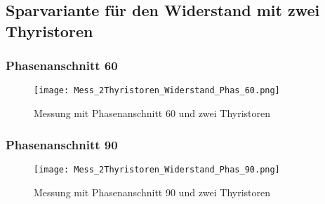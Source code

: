 \begin{appendix}

\newpage
\subsection{Sparvariante für den Widerstand mit zwei Thyristoren} \label{sec:Sparvariante_2Thyristoren}
\subsubsection*{Phasenanschnitt 60\textdegree}

\begin{figure}[ht!]
	\centering
	\texttt{[image: Mess\_2Thyristoren\_Widerstand\_Phas\_60.png]}	
	\caption{Messung mit Phasenanschnitt 60\textdegree \hspace{0.02cm} und zwei Thyristoren}\label{fig:Mess_2Thyristoren_Phas_60grad}
\end{figure}

\newpage
\subsubsection*{Phasenanschnitt 90\textdegree}

\begin{figure}[ht!]
	\centering
	\texttt{[image: Mess\_2Thyristoren\_Widerstand\_Phas\_90.png]}	
	\caption{Messung mit Phasenanschnitt 90\textdegree \hspace{0.02cm} und zwei Thyristoren}\label{fig:Mess_2Thyristoren_Phas_90grad}
\end{figure}


\end{appendix}
